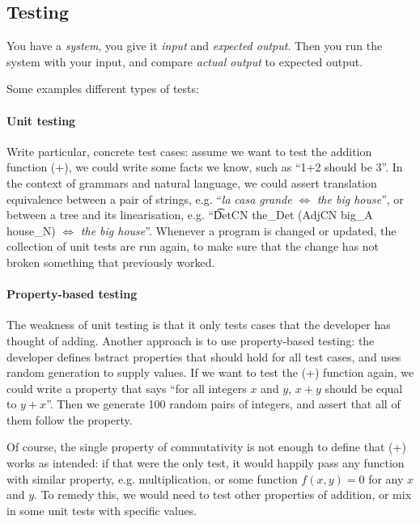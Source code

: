 
\subsection{Testing}

You have a \emph{system}, you give it \emph{input} and 
\emph{expected output}.
Then you run the system with your input, and compare \emph{actual
  output} to expected output.

Some examples different types of tests:

\paragraph{Unit testing}

Write particular, concrete test cases: assume we want to test the
addition function (+), we could write some facts we know, such as
``1+2 should be 3''. In the context of grammars and natural language,
we could assert translation equivalence between a pair of strings,
e.g. ``\emph{la casa grande} $\Leftrightarrow$ \emph{the big house}'',
or between a tree and its linearisation, e.g. ``\t{DetCN the\_Det
  (AdjCN  big\_A house\_N)} $\Leftrightarrow$ \emph{the big house}''.
Whenever a program is changed or updated, the collection of unit tests
are run again, to make sure that the change has not broken something
that previously worked.

\paragraph{Property-based testing}

The weakness of unit testing is that it only tests cases that the
developer has thought of adding. Another approach is to use
property-based testing: the developer defines bstract properties that
should hold for all test cases, and uses random generation to supply
values. If we want to test the (+) function again, we could write a
property that says ``for all integers $x$ and $y$, $x+y$ should be
equal to $y+x$''. Then we generate 100 random pairs of integers, and
assert that all of them follow the property. 

Of course, the single property of commutativity is not enough to
define that (+) works as intended: if that were the only test, it
would happily pass any function with similar property,
e.g. multiplication, or some function $f(x, y) = 0$ for any $x$
and $y$. To remedy this, we would need to test other properties of
addition, or mix in some unit tests with specific values.

